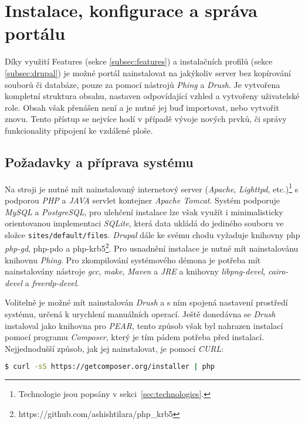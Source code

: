 \chapter{Instalace, konfigurace a správa portálu}
\label{chap:instalace}

Díky využití Features (sekce \ref{subsec:features}) a instalačních profilů (sekce \ref{subsec:drupal}) je možné portál nainstalovat na jakýkoliv server bez kopírování souborů či databáze, pouze za pomocí nástrojů \emph{Phing} a \emph{Drush}. Je vytvořena kompletní struktura obsahu, nastaven odpovídající vzhled a vytvořeny uživatelské role. Obsah však přenášen není a je nutné jej buď importovat, nebo vytvořit znovu. Tento přístup se nejvíce hodí v případě vývoje nových prvků, či správy funkcionality připojení ke vzdálené ploše.

\section{Požadavky a příprava systému}
\label{sec:priprava-systemu}

Na stroji je nutné mít nainstalovaný internetový server (\emph{Apache}, \emph{Lighttpd}, etc.)\footnote{Technologie jsou popsány v sekci~\ref{sec:technologies}.} s podporou \emph{PHP} a \emph{JAVA} \gls{servlet} kontejner \emph{Apache Tomcat}. Systém podporuje \emph{MySQL} a \emph{PostgreSQL}, pro ulehčení instalace lze však využít i minimalisticky orientovanou implementaci \emph{SQLite}, která data ukládá do jediného souboru ve složce \texttt{sites/default/files}. \emph{Drupal} dále ke svému chodu vyžaduje knihovny php \emph{php-gd}, {php-pdo} a {php-krb5\footnote{https://github.com/ashishtilara/php\_krb5}}. Pro usnadnění instalace je nutné mít nainstalovánu knihovnu \emph{Phing}. Pro zkompilování systémového démona je potřeba mít nainstalovány nástroje \emph{gcc}, \emph{make}, \emph{Maven} a \emph{JRE} a knihovny \emph{libpng-devel}, \emph{cairo-devel} a \emph{freerdp-devel}. 

Volitelně je možné mít nainstalován \emph{Drush} a s ním spojená nastavení prostředí systému, určená k urychlení manuálních operací. Ještě donedávna se \emph{Drush} instaloval jako knihovna pro \emph{PEAR}, tento způsob však byl nahrazen instalací pomocí programu \emph{Composer}, který je tím pádem potřeba před instalací. Nejjednodušší způsob, jak jej nainstalovat, je pomocí \emph{CURL}:

\begin{lstlisting}[language=bash]
  $ curl -sS https://getcomposer.org/installer | php
\end{lstlisting}

